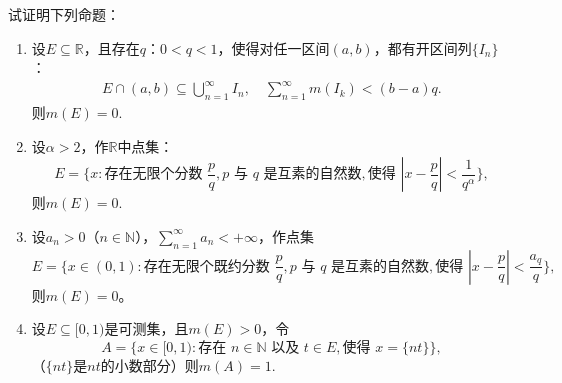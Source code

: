 \documentclass[../../main.tex]{subfiles}%
\begin{document}
\begin{example}
试证明下列命题：
\begin{enumerate}[(1)]
\item 设$E\subseteq\mathbb{R}$，且存在$q$：$0<q<1$，使得对任一区间$(a,b)$，都有开区间列$\{I_n\}$：
\begin{align*}
E\cap(a,b)\subseteq\bigcup\limits_{n=1}^{\infty}I_n,\quad \sum\limits_{n=1}^{\infty}m(I_k)<(b-a)q.
\end{align*}
则$m(E)=0$.

\item 设$\alpha>2$，作$\mathbb{R}$中点集：
\[
E = \{x: \text{存在无限个分数 }\frac{p}{q},p\text{ 与 }q\text{ 是互素的自然数}, \text{使得 }|x-\frac{p}{q}|<\frac{1}{q^\alpha}\},
\]
则$m(E)=0$.

\item 设$a_n>0$（$n\in\mathbb{N}$），$\sum\limits_{n=1}^{\infty}a_n<+\infty$，作点集
\[
E = \{x\in(0,1): \text{存在无限个既约分数 }\frac{p}{q},p\text{ 与 }q\text{ 是互素的自然数}, \text{使得 }|x-\frac{p}{q}|<\frac{a_q}{q}\},
\]
则$m(E)=0$。

\item 设$E\subseteq[0,1)$是可测集，且$m(E)>0$，令
\[
A = \{x\in[0,1): \text{存在 }n\in\mathbb{N}\text{ 以及 }t\in E,\text{使得 }x=\{nt\}\},
\]
（$\{nt\}$是$nt$的小数部分）则$m(A)=1$.
\end{enumerate}
\end{example}
\end{document}
